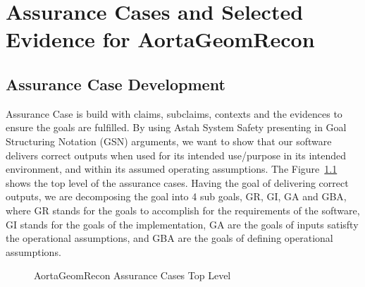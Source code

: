 \chapter{Assurance Cases and Selected Evidence for AortaGeomRecon}

\section{Assurance Case Development}

Assurance Case is build with claims, subclaims, contexts and the evidences to ensure the goals are fulfilled. By using Astah System Safety presenting in Goal Structuring Notation (GSN) arguments, we want to show that our software delivers correct outputs when used for its intended use/purpose in its intended environment, and within its assumed operating assumptions. The Figure~\ref{fig_agr_ac_top} shows the top level of the assurance cases. Having the goal of delivering correct outputs, we are decomposing the goal into 4 sub goals, GR, GI, GA and GBA, where GR stands for the goals to accomplish for the requirements of the software, GI stands for the goals of the implementation, GA are the goals of inputs satisfty the operational assumptions, and GBA are the goals of defining operational assumptions. \cite{kelly2004goal}

\begin{figure}[H]
    \centering
    \caption[AortaGeomRecon Assurance Cases Top Level]{AortaGeomRecon Assurance Cases Top Level}
    \label{fig_agr_ac_top}
\end{figure}


